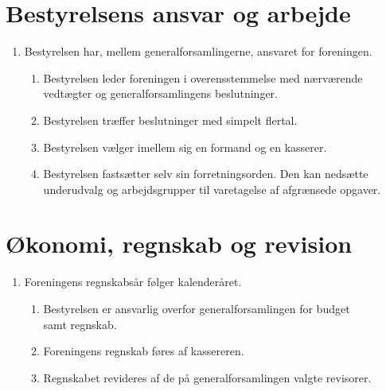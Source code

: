 \documentclass[a4paper]{article}
\newenvironment{stykenum}{
  \begin{enumerate}[%
    label=Stk.~\arabic*., ref=\textsection~\theenumi~Stk.~\arabic*, start=2]
}{\end{enumerate}}
\begin{document}
\section*{Bestyrelsens ansvar og arbejde}

\begin{enumerate}[resume*=afsnit]

\item Bestyrelsen har, mellem generalforsamlingerne, ansvaret for foreningen.

  \begin{stykenum}

  \item Bestyrelsen leder foreningen i overensstemmelse med nærværende
        vedtægter og generalforsamlingens beslutninger.

  \item Bestyrelsen træffer beslutninger med simpelt flertal.

  \item Bestyrelsen vælger imellem sig en formand og en kasserer.

  \item Bestyrelsen fastsætter selv sin forretningsorden. Den kan nedsætte
        underudvalg og arbejdsgrupper til varetagelse af afgrænsede opgaver.

  \end{stykenum}

\end{enumerate}


\section*{Økonomi, regnskab og revision}

\begin{enumerate}[resume*=afsnit]

\item Foreningens regnskabsår følger kalenderåret.

  \begin{stykenum}

  \item Bestyrelsen er ansvarlig overfor generalforsamlingen for budget\\samt
        regnskab.

  \item Foreningens regnskab føres af kassereren.

  \item Regnskabet revideres af de på generalforsamlingen valgte revisorer.

  \end{stykenum}

\end{enumerate}
\end{document}
